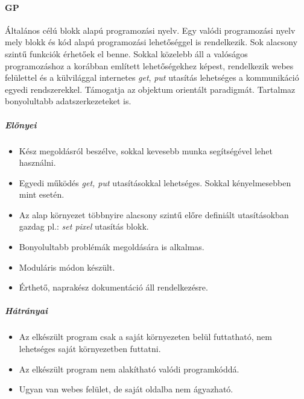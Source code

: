 \documentclass[12pt,a4paper,oneside]{report} %
\begin{document}
\paragraph{GP} Általános célú blokk alapú \cite{ohshima2015module} \cite{monig2015blocks} programozási nyelv. Egy valódi programozási nyelv mely blokk és kód alapú programozási lehetőséggel is rendelkezik.  Sok alacsony szintű funkciók érhetőek el benne. Sokkal közelebb áll a valóságos programozáshoz a korábban említett lehetőségekhez képest, rendelkezik webes felülettel és a külvilággal internetes \textit{get}, \textit{put} utasítás lehetséges a kommunikáció egyedi rendszerekkel. Támogatja az objektum orientált paradigmát. Tartalmaz bonyolultabb adatszerkezeteket is.
\subparagraph{Előnyei} 
\begin{itemize}
	\item Kész megoldásról beszélve, sokkal kevesebb munka segítségével lehet használni.
	\item Egyedi működés \textit{get, put} utasításokkal lehetséges. Sokkal kényelmesebben mint  esetén.
	\item Az alap környezet többnyire alacsony szintű előre definiált utasításokban gazdag pl.: \textit{set pixel} utasítás blokk.
	\item Bonyolultabb problémák megoldására is alkalmas.
	\item Moduláris módon készült.
	\item Érthető, naprakész dokumentáció áll rendelkezésre.
\end{itemize}
\subparagraph{Hátrányai} 
\begin{itemize}
	\item Az elkészült program csak a saját környezeten belül futtatható, nem lehetséges saját környezetben futtatni.
	\item Az elkészült program nem alakítható valódi programkóddá.
	\item Ugyan van webes felület, de saját oldalba nem ágyazható.
\end{itemize}
\end{document}

